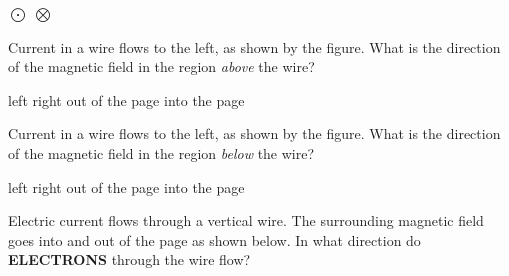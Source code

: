 \documentclass[]{exam}
\begin{document}
\begin{questions}
\begin{randomizechoices}
\CorrectChoice {$\circlearrowright$}
\choice {$\circlearrowleft$}
\choice $\bigodot$
\choice $\bigotimes$
\end{randomizechoices}

\question Current in a wire flows to the left, as shown by the figure. What is the direction of the magnetic field in the region \textit{above} the wire?

\begin{center}
\end{center}

\begin{randomizeoneparchoices}
\choice left
\choice right
\choice out of the page %
\CorrectChoice into the page %
\end{randomizeoneparchoices}

\question Current in a wire flows to the left, as shown by the figure. What is the direction of the magnetic field in the region \textit{below} the wire?

\begin{center}
\end{center}

\begin{randomizeoneparchoices}
\choice left
\choice right
\CorrectChoice out of the page %
\choice into the page %
\end{randomizeoneparchoices}


\question Electric current flows through a vertical wire. The surrounding magnetic field goes into and out of the page as shown below. In what direction do \textbf{ELECTRONS} through the wire flow?

\begin{center}
\end{center}


\end{questions}
\end{document}
